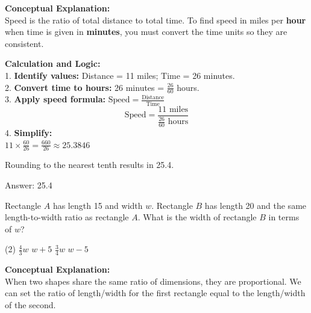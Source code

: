 \documentclass[11pt,paper=a4,answers]{exam}
\begin{document}
\begin{questions}
\begin{solution}
\textbf{Conceptual Explanation:} \\
Speed is the ratio of total distance to total time. To find speed in miles per \textbf{hour} when time is given in \textbf{minutes}, you must convert the time units so they are consistent.

\vspace{30pt}

\textbf{Calculation and Logic:} \\
1. \textbf{Identify values:} Distance = 11 miles; Time = 26 minutes. \\
2. \textbf{Convert time to hours:} 26 minutes = $\frac{26}{60}$ hours. \\
3. \textbf{Apply speed formula:} $\text{Speed} = \frac{\text{Distance}}{\text{Time}}$
\[ \text{Speed} = \frac{11 \text{ miles}}{\frac{26}{60} \text{ hours}} \]
4. \textbf{Simplify:} \\
$11 \times \frac{60}{26} = \frac{660}{26} \approx 25.3846$

\vspace{15pt}

Rounding to the nearest tenth results in 25.4.

\vspace{30pt}

Answer: \colorbox{yellow!100}{25.4}
\end{solution}

\vspace{60pt}

\question
Rectangle $A$ has length 15 and width $w$. Rectangle $B$ has length 20 and the same length-to-width ratio as rectangle $A$. What is the width of rectangle $B$ in terms of $w$?
\begin{tasks}(2)
    \task $\frac{4}{3}w$
    \task $w + 5$
    \task $\frac{3}{4}w$
    \task $w - 5$
\end{tasks}

\begin{solution}
\textbf{Conceptual Explanation:} \\
When two shapes share the same ratio of dimensions, they are proportional. We can set the ratio of length/width for the first rectangle equal to the length/width of the second.

\vspace{30pt}
\begin{center}
\end{center}
\end{solution}
\end{questions}
\end{document}
